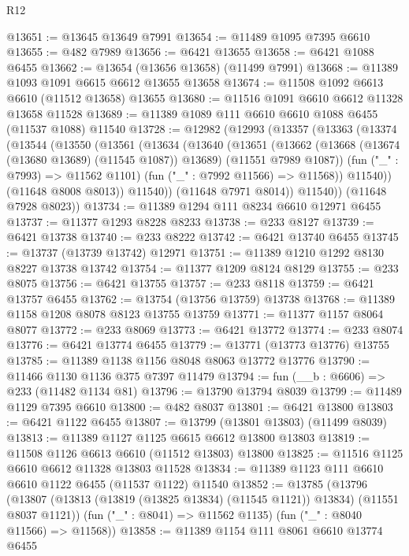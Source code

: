\begin{lexlean}{R12}
\begin{coremodule}
@13651 := @13645 @13649 @7991
@13654 := @11489 @1095 @7395 @6610
@13655 := @482 @7989
@13656 := @6421 @13655
@13658 := @6421 @1088 @6455
@13662 := @13654 (@13656 @13658) (@11499 @7991)
@13668 := @11389 @1093 @1091 @6615 @6612 @13655 @13658
@13674 := @11508 @1092 @6613 @6610 (@11512 @13658) @13655
@13680 := @11516 @1091 @6610 @6612 @11328 @13658 @11528
@13689 := @11389 @1089 @111 @6610 @6610 @1088 @6455 (@11537 @1088) @11540
@13728 := @12982
    (@12993
      (@13357
        (@13363
          (@13374
            (@13544
              (@13550
                (@13561
                  (@13634
                    (@13640
                      (@13651
                        (@13662
                          (@13668 (@13674 (@13680 @13689) (@11545 @1087)) @13689)
                          (@11551 @7989 @1087))
                        (fun ("_" : @7993) => @11562 @1101)
                        (fun ("_" : @7992 @11566) => @11568))
                      @11540))
                  (@11648 @8008 @8013))
                @11540))
            (@11648 @7971 @8014))
          @11540))
      (@11648 @7928 @8023))
@13734 := @11389 @1294 @111 @8234 @6610 @12971 @6455
@13737 := @11377 @1293 @8228 @8233
@13738 := @233 @8127
@13739 := @6421 @13738
@13740 := @233 @8222
@13742 := @6421 @13740 @6455
@13745 := @13737 (@13739 @13742) @12971
@13751 := @11389 @1210 @1292 @8130 @8227 @13738 @13742
@13754 := @11377 @1209 @8124 @8129
@13755 := @233 @8075
@13756 := @6421 @13755
@13757 := @233 @8118
@13759 := @6421 @13757 @6455
@13762 := @13754 (@13756 @13759) @13738
@13768 := @11389 @1158 @1208 @8078 @8123 @13755 @13759
@13771 := @11377 @1157 @8064 @8077
@13772 := @233 @8069
@13773 := @6421 @13772
@13774 := @233 @8074
@13776 := @6421 @13774 @6455
@13779 := @13771 (@13773 @13776) @13755
@13785 := @11389 @1138 @1156 @8048 @8063 @13772 @13776
@13790 := @11466 @1130 @1136 @375 @7397 @11479
@13794 := fun (__b : @6606) => @233 (@11482 @1134 @81)
@13796 := @13790 @13794 @8039
@13799 := @11489 @1129 @7395 @6610
@13800 := @482 @8037
@13801 := @6421 @13800
@13803 := @6421 @1122 @6455
@13807 := @13799 (@13801 @13803) (@11499 @8039)
@13813 := @11389 @1127 @1125 @6615 @6612 @13800 @13803
@13819 := @11508 @1126 @6613 @6610 (@11512 @13803) @13800
@13825 := @11516 @1125 @6610 @6612 @11328 @13803 @11528
@13834 := @11389 @1123 @111 @6610 @6610 @1122 @6455 (@11537 @1122) @11540
@13852 := @13785
    (@13796
      (@13807 (@13813 (@13819 (@13825 @13834) (@11545 @1121)) @13834) (@11551 @8037 @1121))
      (fun ("_" : @8041) => @11562 @1135)
      (fun ("_" : @8040 @11566) => @11568))
@13858 := @11389 @1154 @111 @8061 @6610 @13774 @6455

\end{coremodule}
\end{lexlean}
